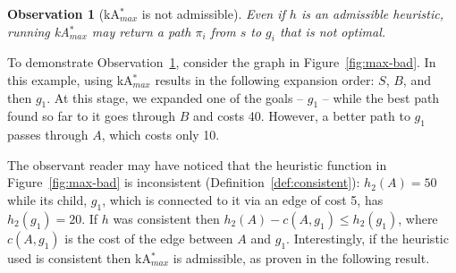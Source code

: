 \documentclass{aicom2e}
\newtheorem{observation}{Observation}
\newcommand{\kastar}{kA$^*$}
\newcommand{\kastarmax}{kA$^*_{max}$}
\newcommand{\maxf}{$F_{max}(n)$}
\newcommand{\roni}[1]{\textbf{[RS:#1]}}
\begin{document}
 \begin{observation}[\kastarmax{} is not admissible]
    Even if $h$ is an admissible heuristic,
    running \kastarmax{} may return a path $\pi_i$ from $s$ to $g_i$ that is not optimal.
    \label{obs:max-f-inadmissible}
 \end{observation}


To demonstrate Observation~\ref{obs:max-f-inadmissible}, consider the graph in
Figure~\ref{fig:max-bad}. In this example, using \kastarmax{} results in the
following expansion order: $S$, $B$, and then $g_1$. At this stage, we expanded
one of the goals -- $g_1$ -- while the best path found so far to it goes
through $B$ and costs 40. However, a better path to $g_1$ passes through $A$,
which costs only 10.




The observant reader may have noticed that the heuristic function in
Figure~\ref{fig:max-bad} is inconsistent (Definition~\ref{def:consistent}):
$h_2(A)=50$ while its child, $g_1$, which is connected to it via an edge of
cost 5, has $h_2(g_1)=20$. If $h$ was consistent then $h_2(A)-c(A,g_1)\leq
h_2(g_1)$, where $c(A,g_1)$ is the cost of the edge between $A$ and $g_1$.
Interestingly, if the heuristic used is consistent then \kastarmax{} is admissible, as proven in the following result. %



\end{document}
